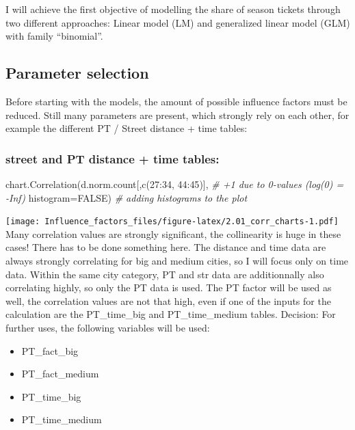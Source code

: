 \documentclass[
]{article}
\newenvironment{Shaded}{\begin{snugshade}}{\end{snugshade}}
\newcommand{\AttributeTok}[1]{\textcolor[rgb]{0.77,0.63,0.00}{#1}}
\newcommand{\CommentTok}[1]{\textcolor[rgb]{0.56,0.35,0.01}{\textit{#1}}}
\newcommand{\ConstantTok}[1]{\textcolor[rgb]{0.00,0.00,0.00}{#1}}
\newcommand{\DecValTok}[1]{\textcolor[rgb]{0.00,0.00,0.81}{#1}}
\newcommand{\FunctionTok}[1]{\textcolor[rgb]{0.00,0.00,0.00}{#1}}
\newcommand{\NormalTok}[1]{#1}
\newcommand{\SpecialCharTok}[1]{\textcolor[rgb]{0.00,0.00,0.00}{#1}}
\providecommand{\tightlist}{%
  \setlength{\itemsep}{0pt}\setlength{\parskip}{0pt}}
\begin{document}
I will achieve the first objective of modelling the share of season
tickets through two different approaches: Linear model (LM) and
generalized linear model (GLM) with family ``binomial''.

\hypertarget{parameter-selection}{%
\subsection{Parameter selection}\label{parameter-selection}}

Before starting with the models, the amount of possible influence
factors must be reduced. Still many parameters are present, which
strongly rely on each other, for example the different PT / Street
distance + time tables:

\hypertarget{street-and-pt-distance-time-tables}{%
\subsubsection{street and PT distance + time
tables:}\label{street-and-pt-distance-time-tables}}

\begin{Shaded}
\begin{Highlighting}[]
\FunctionTok{chart.Correlation}\NormalTok{(d.norm.count[,}\FunctionTok{c}\NormalTok{(}\DecValTok{27}\SpecialCharTok{:}\DecValTok{34}\NormalTok{, }\DecValTok{44}\SpecialCharTok{:}\DecValTok{45}\NormalTok{)], }\CommentTok{\# +1 due to 0{-}values (log(0) = {-}Inf)}
                  \AttributeTok{histogram=}\ConstantTok{FALSE}\NormalTok{) }\CommentTok{\# adding histograms to the plot}
\end{Highlighting}
\end{Shaded}

\texttt{[image: Influence\_factors\_files/figure-latex/2.01\_corr\_charts-1.pdf]}
Many correlation values are strongly significant, the collinearity is
huge in these cases! There has to be done something here. The distance
and time data are always strongly correlating for big and medium cities,
so I will focus only on time data. Within the same city category, PT and
str data are additionnally also correlating highly, so only the PT data
is used. The PT factor will be used as well, the correlation values are
not that high, even if one of the inputs for the calculation are the
PT\_time\_big and PT\_time\_medium tables. Decision: For further uses,
the following variables will be used:

\begin{itemize}
\tightlist
\item
  PT\_fact\_big
\item
  PT\_fact\_medium
\item
  PT\_time\_big
\item
  PT\_time\_medium
\end{itemize}
\end{document}
